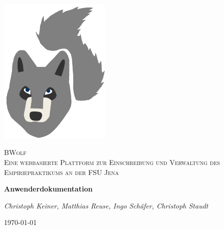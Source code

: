 \documentclass[12pt,a4paper]{report}
\begin{document}
    \onehalfspacing
    
    \begin{titlepage}
        \centering
        \includegraphics[width=0.4\textwidth]{./LogoSoFar.png}\par\vspace{1cm}
        {\scshape \LARGE BWolf \\ \Large Eine webbasierte Plattform zur
            Einschreibung und Verwaltung des
            Empiriepraktikums an der FSU Jena\par}
        \vspace{1.5cm}
        {\huge\bfseries Anwenderdokumentation\par}
        \vspace{1.5cm}
        {\large\itshape Christoph Keiner, Matthias Reuse, Ingo Schäfer, Christoph Staudt\par}
        \vspace{1.0cm}
        {\large \today\par}
    \end{titlepage}

    \tableofcontents 
    \clearpage
\end{document}
